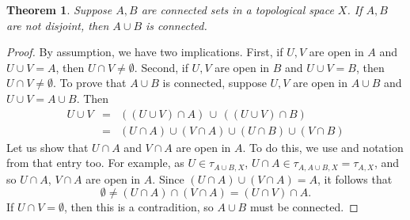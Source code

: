 \documentclass[12pt]{article}
\newtheorem{thm}{Theorem}
\begin{document}
\begin{thm} Suppose $A,B$ are connected sets in a topological 
  space $X$. If $A,B$ are not disjoint, then $A\cup B$ is connected.
\end{thm}

\begin{proof} By assumption, we have two implications.
First, if $U,V$ are open in $A$ and $U\cup V=A$, then $U\cap V\neq \emptyset$.
Second, if $U,V$ are open in $B$ and $U\cup V=B$, then $U\cap V\neq \emptyset$.
To prove that $A\cup B$ is connected, suppose $U,V$ are open in $A\cup B$
and $U\cup V=A\cup B$.
Then 
\begin{eqnarray*}
  U\cup V &=& ((U\cup V )\cap A) \,\cup \,((U\cup V)\cap B) \\
&=& (U\cap A) \cup (V\cap A) \cup (U\cap B)\cup (V\cap B)
\end{eqnarray*}
Let us show that $U\cap A$ and $V\cap A$ are open in $A$. 
To do this, we use 
  and notation from that entry too. 
For example, as $U\in \tau_{A\cup B, X}$, $U\cap A \in \tau_{A,A\cup B, X}=\tau_{A,X}$, 
  and so $U\cap A$, $V\cap A$ are open in $A$. 
Since $(U\cap A)\cup (V\cap A)=A$, it follows that 
$$
  \emptyset \neq (U\cap A)\cap (V\cap A) =(U\cap V)\cap A.
$$
If $U\cap V=\emptyset$, then this is a contradition, so 
   $A\cup B$ must be connected.
\end{proof}
\end{document}
